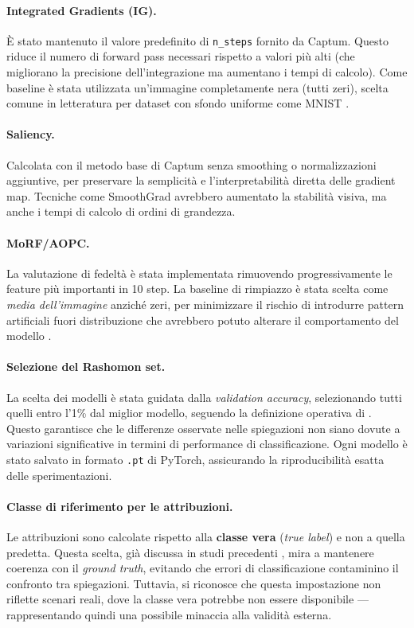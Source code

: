\documentclass[12pt,a4paper,oneside]{report}
\numberwithin{figure}{chapter}
\numberwithin{table}{chapter}
\begin{document}
\paragraph{Integrated Gradients (IG).}
È stato mantenuto il valore predefinito di \texttt{n\_steps} fornito da Captum.
Questo riduce il numero di forward pass necessari rispetto a valori più alti (che migliorano la precisione dell’integrazione ma aumentano i tempi di calcolo).
Come baseline è stata utilizzata un’immagine completamente nera (tutti zeri), scelta comune in letteratura per dataset con sfondo uniforme come MNIST \citep{sundararajan2017axiomatic}.

\paragraph{Saliency.}
Calcolata con il metodo base di Captum senza smoothing o normalizzazioni
aggiuntive, per preservare la semplicità e l’interpretabilità diretta delle
gradient map. Tecniche come SmoothGrad \citep{smilkov2017smoothgrad} avrebbero
aumentato la stabilità visiva, ma anche i tempi di calcolo di ordini di
grandezza.

\paragraph{MoRF/AOPC.}
La valutazione di fedeltà è stata implementata rimuovendo progressivamente le
feature più importanti in 10 step. La baseline di rimpiazzo è stata scelta come
\textit{media dell’immagine} anziché zeri, per minimizzare il rischio di
introdurre pattern artificiali fuori distribuzione che avrebbero potuto
alterare il comportamento del modello \citep{samek2016evaluating}.

\paragraph{Selezione del Rashomon set.}
La scelta dei modelli è stata guidata dalla \textit{validation accuracy},
selezionando tutti quelli entro l’1\% dal miglior modello, seguendo la
definizione operativa di \citet{mueller2023rashomon}. Questo garantisce che le
differenze osservate nelle spiegazioni non siano dovute a variazioni
significative in termini di performance di classificazione. Ogni modello è
stato salvato in formato \texttt{.pt} di PyTorch, assicurando la
riproducibilità esatta delle sperimentazioni.

\paragraph{Classe di riferimento per le attribuzioni.}
Le attribuzioni sono calcolate rispetto alla \textbf{classe vera} (\textit{true
      label}) e non a quella predetta. Questa scelta, già discussa in studi
precedenti \citep{arras2019evaluating}, mira a mantenere coerenza con il
\textit{ground truth}, evitando che errori di classificazione contaminino il
confronto tra spiegazioni. Tuttavia, si riconosce che questa impostazione non
riflette scenari reali, dove la classe vera potrebbe non essere disponibile —
rappresentando quindi una possibile minaccia alla validità esterna.
\end{document}
